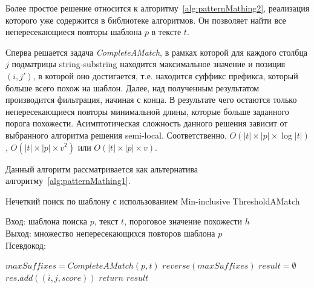 Более простое решение относится к алгоритму~\ref{alg:patternMathing2}, реализация которого уже содержится в библиотеке алгоритмов. 
Он позволяет найти все непересекающиеся повторы шаблона $p$ в тексте $t$.

Сперва решается задача \emph{CompleteAMatch}, в рамках которой для каждого столбца $j$ подматрицы {string-substring} находится максимальное значение и позиция $(i,j')$, в которой оно  достигается, т.е. находится суффикс префикса, который больше всего похож на шаблон.
Далее, над полученным результатом производится фильтрация, начиная с конца.
В результате чего остаются только непересекающиеся повторы минимальной длины, которые больше заданного порога похожести.
Асимптотическая сложность данного решения зависит от выбранного алгоритма  решения {semi-local}.
Соответственно, $O(|t| \times |p| \times \log |t|)$, $O(|t| \times |p| \times v^2)$ или $O(|t| \times |p| \times v)$.

Данный алгоритм рассматривается как альтернатива алгоритму~\ref{alg:patternMathing1}.

\begin{algorithm}[b!]
\caption{Нечеткий поиск по шаблону с использованием Min-inclusive ThresholdAMatch}\label{alg:patternMathing2}
Вход: шаблона поиска $p$, текст $t$, пороговое значение похожести $h$\\
Выход: множество непересекающихся повторов шаблона $p$\\
Псевдокод:
\begin{algorithmic}[1]
\State $maxSuffixes= CompleteAMatch(p,t)$
\State $reverse(maxSuffixes)$
\State $result = \emptyset$
    \State $res.add((i,j,score))$ 
    \EndIf
\EndFor
\State $return$ $result$

\end{algorithmic}
\end{algorithm}



